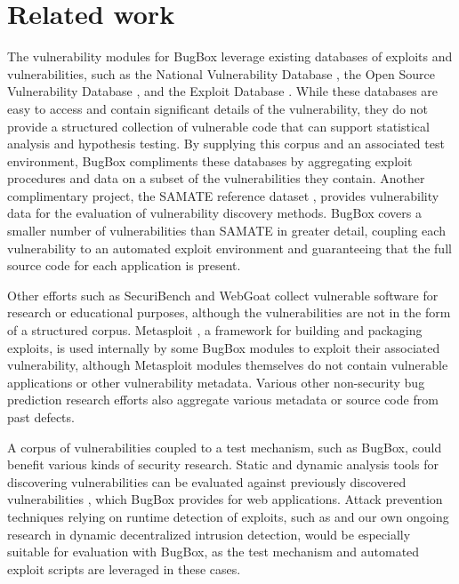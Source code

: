 \documentclass[letterpaper,twocolumn,10pt]{article}
\begin{document}
\section{Related work}
The vulnerability modules for BugBox leverage existing databases of exploits and vulnerabilities, such as the National Vulnerability Database \cite{NVD}, the Open Source Vulnerability Database \cite{OSVDB}, and the Exploit Database \cite{exploitdb}. While these databases are easy to access and contain significant details of the vulnerability, they do not provide a structured collection of vulnerable code that can support statistical analysis and hypothesis testing. By supplying this corpus and an associated test environment, BugBox compliments these databases by aggregating exploit procedures and data on a subset of the vulnerabilities they contain. Another complimentary project, the SAMATE reference dataset \cite{SAMATE}, provides vulnerability data for the evaluation of vulnerability discovery methods. BugBox covers a smaller number of vulnerabilities than SAMATE in greater detail, coupling each vulnerability to an automated exploit environment and guaranteeing that the full source code for each application is present.

Other efforts such as SecuriBench \cite{livshits2005defining} and WebGoat \cite{webgoat} collect vulnerable software for research or educational purposes, although the vulnerabilities are not in the form of a structured corpus. Metasploit \cite{metasploit}, a framework for building and packaging exploits, is used internally by some BugBox modules to exploit their associated vulnerability, although Metasploit modules themselves do not contain vulnerable applications or other vulnerability metadata. Various other non-security bug prediction research efforts \cite{defectcorpus,eclipsebugdata} also aggregate various metadata or source code from past defects.

A corpus of vulnerabilities coupled to a test mechanism, such as BugBox, could benefit various kinds of security research. Static and dynamic analysis tools for discovering vulnerabilities \cite{onetechnique,antunes2009comparing} can be evaluated against previously discovered vulnerabilities \cite{bufferoverflowbenchmark}, which BugBox provides for web applications. Attack prevention techniques relying on runtime detection of exploits, such as \cite{commandinjection} and our own ongoing research in dynamic decentralized intrusion detection, would be especially suitable for evaluation with BugBox, as the test mechanism and automated exploit scripts are leveraged in these cases.
\end{document}
